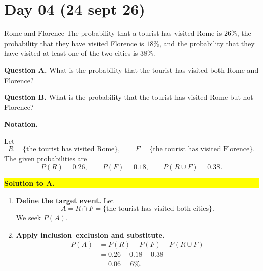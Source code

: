 \documentclass[a4paper,12pt,oneside]{report}
\newcommand{\exerciseheading}[1]{%
  \par\Needspace{5\baselineskip}\noindent\textbf{#1}\par\nobreak}
\newcommand{\solutionheading}[1]{%
  \par\Needspace{5\baselineskip}\noindent
  \begingroup\setlength{\fboxsep}{1pt}%
  \colorbox{yellow}{\strut\textbf{#1}}\endgroup\par\nobreak}
\begin{document}
\section{Day 04 (24 sept 26)}

\begin{framedexercise}{Rome and Florence}
The probability that a tourist has visited Rome is $26\%$, the
probability that they have visited Florence is $18\%$, and the
probability that they have visited at least one of the two cities is
$38\%$.

\textbf{Question A.} What is the probability that the tourist has visited
both Rome and Florence?

\textbf{Question B.} What is the probability that the tourist has visited
Rome but not Florence?
\end{framedexercise}

\exerciseheading{Notation.}
Let
\[
  R=\{\text{the tourist has visited Rome}\},\qquad
  F=\{\text{the tourist has visited Florence}\}.
\]
The given probabilities are
\[
  P(R)=0.26,\qquad P(F)=0.18,\qquad P(R\cup F)=0.38.
\]

\solutionheading{Solution to A.}
\begin{enumerate}[label=\textbf{Step \arabic*:},leftmargin=*]
  \item \textbf{Define the target event.} Let
  \[
    A=R\cap F=\{\text{the tourist has visited both cities}\}.
  \]
  We seek $P(A)$.
  \item \textbf{Apply inclusion--exclusion and substitute.}
  \begin{align*}
    P(A)
      &=P(R)+P(F)-P(R\cup F)\\
      &=0.26+0.18-0.38\\
      &=\boxed{0.06=6\%}.
  \end{align*}
\end{enumerate}
\end{document}
